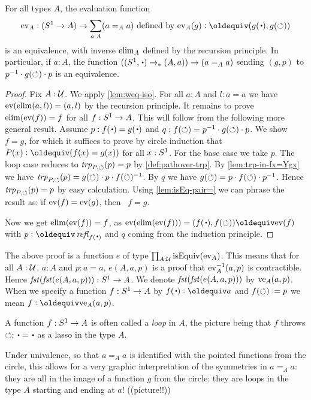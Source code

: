 \begin{lemma}\label{lem:freeloopspace}
For all types $A$, the evaluation function 
\[
\ev_A : (\Sc\to A)\to \sum_{a:A}(a=_Aa)\text{~defined by~} 
\ev_A(g)\defeq (g(\base),g(\Sloop))
\]
is an equivalence, with inverse $\mathrm{elim}_A$ defined by the recursion principle.  
In particular, if $a:A$, the function $((\Sc,\base)\to_* (A,a))\to (a=_Aa)$
sending $(g,p)$ to $p^{-1}\cdot g(\circlearrowleft)\cdot p$ is an equivalence.
\end{lemma}
\begin{proof}
Fix $A:\mathcal{U}$. We apply \cref{lem:weq-iso}. 
For all $a:A$ and $l:a=a$ we have $\mathrm{ev}(\mathrm{elim}(a,l))=(a,l)$
by the recursion principle. It remains to prove
$\mathrm{elim}(\mathrm{ev}(f))=f$ for all $f:{S^1}\to A$. This will follow
from the following more general result. Assume 
$p: f(\base)= g(\base)$ and $q: f(\circlearrowleft) = p^{-1}\cdot g(\circlearrowleft)\cdot p$.
We show $f=g$, for which it suffices to prove by circle induction
that $P(x)\defeq(f(x)=g(x))$ for all $x:{S^1}$.
For the base case we take $p$.
The loop case reduces to $\mathop{\mathit{trp}_{P,\circlearrowleft}}(p)=p$ by \cref{def:pathover-trp}.
By \cref{lem:trp-in-fx=Ygx} we have 
$\mathop{\mathit{trp}_{P,\circlearrowleft}}(p)=g(\circlearrowleft)\cdot p \cdot f(\circlearrowleft)^{-1}$. 
By $q$ we have $g(\circlearrowleft) = p\cdot f(\circlearrowleft) \cdot p^{-1}$.
Hence $\mathop{\mathit{trp}_{P,\circlearrowleft}}(p)=p$ by easy calculation.
Using \cref{lem:isEq-pair=} we can phrase the result
as: if $\mathrm{ev}(f)=\mathrm{ev}(g)$, then  $f=g$.

Now we get $\mathrm{elim}(\mathrm{ev}(f))=f$, as
$\ev(\el(\ev(f)))=(f(\base),f(\Sloop))\jdeq\ev(f)$ with $p\defeq\refl{f(\base)}$
and $q$ coming from the induction principle.
\end{proof}

{\color{blue}
The above proof is a function $e$ of type $\prod_{A:\mathcal{U}} \mathrm{isEquiv}(\mathrm{ev}_A)$.
This means that for all $A:\mathcal{U}$, $a:A$ and $p:a=a$, 
$e(A,a,p)$ is a proof that $\mathrm{ev}_A^{-1}(a,p)$ is contractible. Hence 
$\mathop{\mathit{fst}}(\mathop{\mathit{fst}}(e(A,a,p))):{S^1}\to A$. 
We denote $\mathop{\mathit{fst}}(\mathop{\mathit{fst}}(e(A,a,p)))$ by $\mathrm{ve}_A(a,p)$. When we specify a function
$f:{S^1}\to A$ by $f(\base)\defeq a$ and $f(\circlearrowleft)\vcentcolon= p$ we mean
$f\defeq\ve_A(a,p)$.
}

\begin{remark}
A function $f:{S^1}\to A$ is often called a \emph{loop} in $A$, 
the picture being that $f$ throws $\Sloop:\base=\base$ as a lasso in the type $A$.

  Under univalence, so that $a=_Aa$ is identified with the pointed functions 
from the circle, this allows for a very graphic interpretation of the 
symmetries in $a=_Aa$: they are all in the image of a function $g$ from 
the circle: they are loops in the type $A$ starting and ending at $a$! ((picture!!))
\end{remark}

